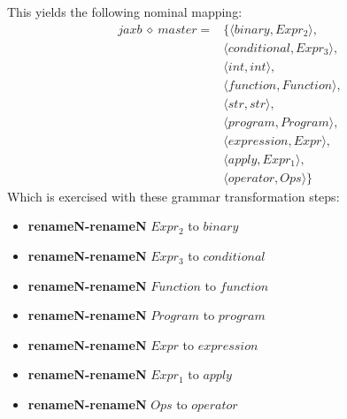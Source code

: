 This yields the following nominal mapping:
\begin{align*}\mathit{jaxb} \:\diamond\: \mathit{master} =& \{\langle \mathit{binary},\mathit{Expr_2}\rangle,\\
 & \langle \mathit{conditional},\mathit{Expr_3}\rangle,\\
 & \langle int,int\rangle,\\
 & \langle \mathit{function},\mathit{Function}\rangle,\\
 & \langle str,str\rangle,\\
 & \langle \mathit{program},\mathit{Program}\rangle,\\
 & \langle \mathit{expression},\mathit{Expr}\rangle,\\
 & \langle \mathit{apply},\mathit{Expr_1}\rangle,\\
 & \langle \mathit{operator},\mathit{Ops}\rangle\}\end{align*}
 Which is exercised with these grammar transformation steps:

{\footnotesize\begin{itemize}
\item \textbf{renameN-renameN} $\mathit{Expr_2}$ to $\mathit{binary}$
\item \textbf{renameN-renameN} $\mathit{Expr_3}$ to $\mathit{conditional}$
\item \textbf{renameN-renameN} $\mathit{Function}$ to $\mathit{function}$
\item \textbf{renameN-renameN} $\mathit{Program}$ to $\mathit{program}$
\item \textbf{renameN-renameN} $\mathit{Expr}$ to $\mathit{expression}$
\item \textbf{renameN-renameN} $\mathit{Expr_1}$ to $\mathit{apply}$
\item \textbf{renameN-renameN} $\mathit{Ops}$ to $\mathit{operator}$
\end{itemize}}

